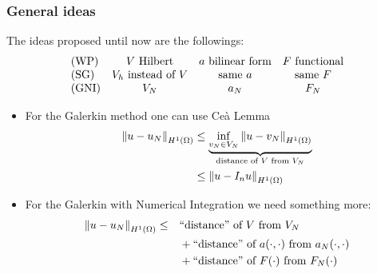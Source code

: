 \subsubsection*{General ideas}
The ideas proposed until now are the followings:
\[
    \begin{array}{lccc}
        \text{(WP)} & V \text{ Hilbert} & a \text{ bilinear form} & F \text{ functional} \\ 
        \text{(SG)} & V_h \text{ instead of } V & \text{same }a &  \text{same } F \\ 
        \text{(GNI)} & V_N & a_N  & F_N\\ 
    \end{array}
\]
\begin{itemize}
    \item For the Galerkin method one can use Ceà Lemma 
    \begin{align*}
        \norm{u-u_N}_{H^1(\Omega)} &\leq \underbrace{\inf_{v_N \in V_N}\norm{u-v_N}_{H^1(\Omega)}}_{\text{distance of } V \text{ from }V_N} \\
        &\leq \norm{u-I_nu}_{H^1(\Omega)}
    \end{align*}
    \item For the Galerkin with Numerical Integration we need something more:
    \begin{align*}
        \norm{u-u_N}_{H^1(\Omega)} \leq\quad & \text{``distance'' of } V \text{ from }V_N \\
        &+ \text{``distance'' of } a(\cdot,\cdot) \text{ from }a_N(\cdot,\cdot) \\
        &+ \text{``distance'' of } F(\cdot) \text{ from }F_N(\cdot)
    \end{align*}
\end{itemize}
